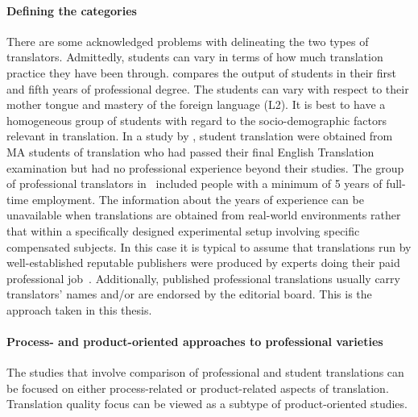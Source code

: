 \paragraph{Defining the categories} There are some acknowledged problems with delineating the two types of translators. Admittedly, students can vary in terms of how much translation practice they have been through. \citet{Tirkkonen1990} compares the output of students in their first and fifth years of professional degree. The students can vary with respect to their mother tongue and mastery of the foreign language (L2). It is best to have a homogeneous group of students with regard to the socio-demographic factors relevant in translation. 
In a study by \citet{Daems2017}, student translation were obtained from MA students of translation who had passed their final English Translation examination but had no professional experience beyond their studies. 
The group of professional translators in~\citet{Daems2017} included people with a minimum of 5 years of full-time employment.
The information about the years of experience can be unavailable when translations are obtained from real-world environments rather that within a specifically designed experimental setup involving specific compensated subjects. In this case it is typical to assume that translations run by well-established reputable publishers were produced by experts doing their paid professional job~\cite[see][for example]{Redelinghuys2015}. Additionally, published professional translations usually carry translators' names and/or are endorsed by the editorial board. This is the approach taken in this thesis.

\paragraph{Process- and product-oriented approaches to professional varieties} The studies that involve comparison of professional and student translations can be focused on either process-related or product-related aspects of translation. Translation quality focus can be viewed as a subtype of product-oriented studies.

